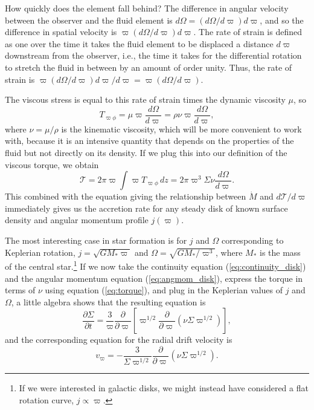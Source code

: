 How quickly does the element fall behind? The difference in angular velocity between the observer and the fluid element is $d\Omega = (d\Omega/d\varpi) d\varpi$, and so the difference in spatial velocity is $\varpi (d\Omega/d\varpi) d\varpi$. The rate of strain is defined as one over the time it takes the fluid element to be displaced a distance $d\varpi$ downstream from the observer, i.e., the time it takes for the differential rotation to stretch the fluid in between by an amount of order unity. Thus, the rate of strain is $\varpi (d\Omega/d\varpi) d\varpi/d\varpi = \varpi (d\Omega/d\varpi)$.

The viscous stress is equal to this rate of strain times the dynamic viscosity $\mu$, so
\begin{equation}
T_{\varpi\phi} = \mu \varpi \frac{d\Omega}{d\varpi} = \rho \nu \varpi \frac{d\Omega}{d\varpi},
\end{equation}
where $\nu=\mu/\rho$ is the kinematic viscosity, which will be more convenient to work with, because it is an intensive quantity that depends on the properties of the fluid but not directly on its density. If we plug this into our definition of the viscous torque, we obtain
\begin{equation}
\label{eq:torque}
\mathcal{T} = 2\pi \varpi \int \varpi T_{\varpi\phi}\, dz = 2\pi \varpi^3 \Sigma \nu \frac{d\Omega}{d\varpi}.
\end{equation}
This combined with the equation giving the relationship between $\dot{M}$ and $d\mathcal{T}/d\varpi$ immediately gives us the accretion rate for any steady disk of known surface density and angular momentum profile $j(\varpi)$.

The most interesting case in star formation is for $j$ and $\Omega$ corresponding to Keplerian rotation, $j=\sqrt{GM_*\varpi}$ and $\Omega=\sqrt{GM_*/\varpi^3}$, where $M_*$ is the mass of the central star.\footnote{If we were interested in galactic disks, we might instead have considered a flat rotation curve, $j\propto \varpi$.} If we now take the continuity equation (\ref{eq:continuity_disk}) and the angular momentum equation (\ref{eq:angmom_disk}), express the torque in terms of $\nu$ using equation (\ref{eq:torque}), and plug in the Keplerian values of $j$ and $\Omega$, a little algebra shows that the resulting equation is
\begin{equation}
\label{eq:disk_keplerian}
\frac{\partial \Sigma}{\partial t} = \frac{3}{\varpi} \frac{\partial}{\partial \varpi} \left[\varpi^{1/2} \frac{\partial}{\partial \varpi}\left(\nu \Sigma \varpi^{1/2}\right)\right],
\end{equation}
and the corresponding equation for the radial drift velocity is
\begin{equation}
v_\varpi = -\frac{3}{\Sigma \varpi^{1/2}} \frac{\partial}{\partial \varpi}(\nu \Sigma \varpi^{1/2}).
\end{equation}

